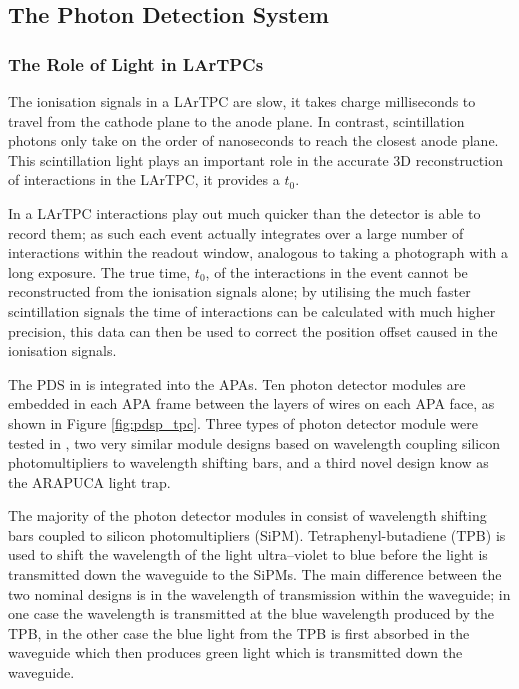 \subsection{The Photon Detection System}

\subsubsection*{The Role of Light in LArTPCs}

The ionisation signals in a LArTPC are slow, it takes charge milliseconds to
travel from the cathode plane to the anode plane. In contrast, scintillation 
photons only take on the order of nanoseconds to reach the closest anode 
plane. This scintillation light plays an important role in the accurate 3D 
reconstruction of interactions in the LArTPC, it provides a $t_0$. 

In a LArTPC interactions play out much quicker than the detector is able to 
record them; as such each event actually integrates over a large number of
interactions within the readout window, analogous to taking a photograph with a 
long exposure. The true time, $t_0$, of the interactions in the event cannot be 
reconstructed from the ionisation signals alone; by utilising the much faster 
scintillation signals the time of interactions can be calculated with much 
higher precision, this data can then be used to correct the position offset
caused in the ionisation signals.

\bigskip

The PDS in \protodune{} is integrated into the APAs. Ten photon detector modules
are embedded in each APA frame between the layers of wires on each APA 
face, as shown in Figure \ref{fig:pdsp_tpc}. Three types of photon detector
module were tested in \protodune{}, two very similar module designs based on
wavelength coupling silicon photomultipliers to wavelength shifting bars, and a
third novel design know as the ARAPUCA light trap.

The majority of the photon detector modules in \protodune{}  consist of 
wavelength shifting bars coupled to silicon photomultipliers (SiPM). 
Tetraphenyl-butadiene (TPB) is used to shift the wavelength of the light 
ultra--violet to blue before the light is transmitted down the waveguide to 
the SiPMs. The main difference between the two nominal designs is in the 
wavelength of transmission within the waveguide; in one case the wavelength is 
transmitted at the blue wavelength produced by the TPB, in the other case the 
blue light from the TPB is first absorbed in the waveguide which then produces 
green light which is transmitted down the waveguide.

